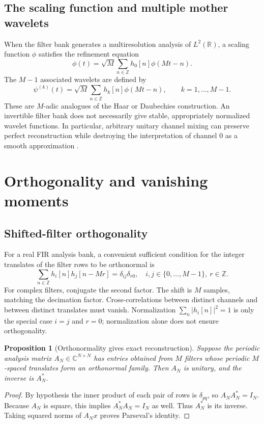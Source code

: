 \documentclass{article}
\newtheorem{proposition}[theorem]{Proposition}
\theoremstyle{definition}
\theoremstyle{remark}
\newcommand{\R}{\mathbb R}
\newcommand{\C}{\mathbb C}
\newcommand{\Z}{\mathbb Z}
\newcommand{\abs}[1]{\left\lvert#1\right\rvert}
\begin{document}
\subsection{The scaling function and multiple mother wavelets}
When the filter bank generates a multiresolution analysis of $L^2(\R)$, a scaling function $\phi$ satisfies the refinement equation
\begin{equation}
 \phi(t)=\sqrt M\sum_{n\in\Z}h_0[n]\phi(Mt-n).
 \label{eq:refine}
\end{equation}
The $M-1$ associated wavelets are defined by
\begin{equation}
 \psi^{(k)}(t)=\sqrt M\sum_{n\in\Z}h_k[n]\phi(Mt-n),
 \qquad k=1,\ldots,M-1.
 \label{eq:mother}
\end{equation}
These are $M$-adic analogues of the Haar or Daubechies construction. An invertible filter bank does not necessarily give stable, appropriately normalized wavelet functions. In particular, arbitrary unitary channel mixing can preserve perfect reconstruction while destroying the interpretation of channel $0$ as a smooth approximation \cite{steffen1993,lin2006}.

\section{Orthogonality and vanishing moments}
\subsection{Shifted-filter orthogonality}
For a real FIR analysis bank, a convenient sufficient condition for the integer translates of the filter rows to be orthonormal is
\begin{equation}
\sum_{n\in\Z}h_i[n]h_j[n-Mr]=\delta_{ij}\delta_{r0},
\quad i,j\in\{0,\ldots,M-1\},\ r\in\Z.
\label{eq:crosscorr}
\end{equation}
For complex filters, conjugate the second factor. The shift is $M$ samples, matching the decimation factor. Cross-correlations between distinct channels and between distinct translates must vanish. Normalization $\sum_n\abs{h_i[n]}^2=1$ is only the special case $i=j$ and $r=0$; normalization alone does not ensure orthogonality.

\begin{proposition}[Orthonormality gives exact reconstruction]
Suppose the periodic analysis matrix $A_N\in\C^{N\times N}$ has entries obtained from $M$ filters whose periodic $M$-spaced translates form an orthonormal family. Then $A_N$ is unitary, and the inverse is $A_N^*$.
\end{proposition}
\begin{proof}
By hypothesis the inner product of each pair of rows is $\delta_{pq}$, so $A_NA_N^*=I_N$. Because $A_N$ is square, this implies $A_N^*A_N=I_N$ as well. Thus $A_N^*$ is its inverse. Taking squared norms of $A_Nx$ proves Parseval's identity.
\end{proof}
\end{document}
